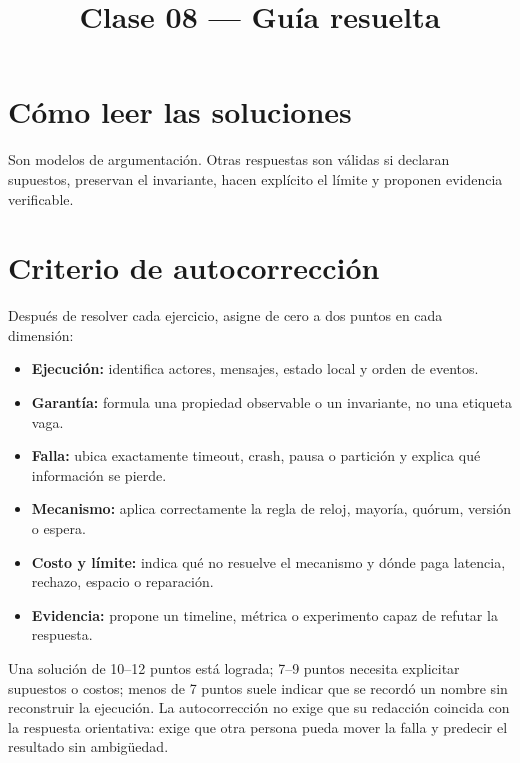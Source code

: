 \documentclass[variant=guiaresuelta,cover=institutional,mode=screen]{ua-engineering-v6-article}
\title{Clase 08 --- Guía resuelta}
\author{\UAProfessor}
\date{\UADate}
\begin{document}
\maketitle
\section{Cómo leer las soluciones}
Son modelos de argumentación. Otras respuestas son válidas si declaran supuestos, preservan el invariante, hacen explícito el límite y proponen evidencia verificable.

\section{Criterio de autocorrección}
Después de resolver cada ejercicio, asigne de cero a dos puntos en cada dimensión:
\begin{itemize}
\item \textbf{Ejecución:} identifica actores, mensajes, estado local y orden de eventos.
\item \textbf{Garantía:} formula una propiedad observable o un invariante, no una etiqueta vaga.
\item \textbf{Falla:} ubica exactamente timeout, crash, pausa o partición y explica qué información se pierde.
\item \textbf{Mecanismo:} aplica correctamente la regla de reloj, mayoría, quórum, versión o espera.
\item \textbf{Costo y límite:} indica qué no resuelve el mecanismo y dónde paga latencia, rechazo, espacio o reparación.
\item \textbf{Evidencia:} propone un timeline, métrica o experimento capaz de refutar la respuesta.
\end{itemize}
Una solución de 10--12 puntos está lograda; 7--9 puntos necesita explicitar supuestos o costos; menos de 7 puntos suele indicar que se recordó un nombre sin reconstruir la ejecución. La autocorrección no exige que su redacción coincida con la respuesta orientativa: exige que otra persona pueda mover la falla y predecir el resultado sin ambigüedad.
\end{document}
